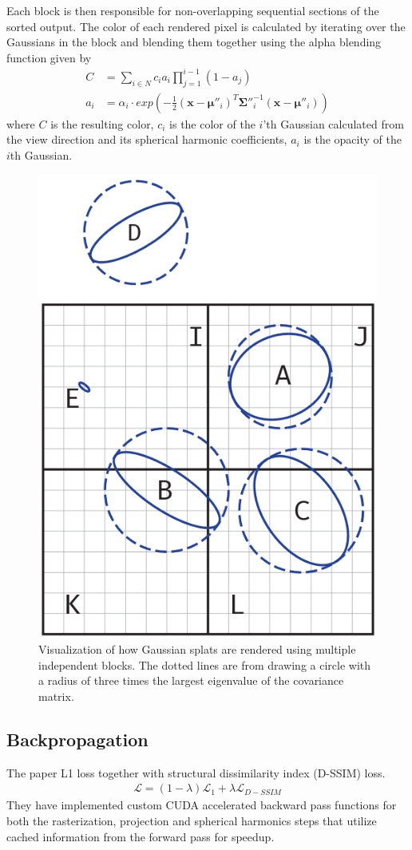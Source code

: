 Each block is then responsible for non-overlapping sequential sections of the sorted output.
The color of each rendered pixel is calculated by iterating over the Gaussians in the block and blending them together using the alpha blending function given by
\begin{align}
    C   & = \sum_{i \in N} c_i a_i \prod_{j=1}^{i-1} (1-a_j)                                                     \\
    a_i & = \alpha_i \cdot exp(-\frac{1}{2}(\bm{x}-\bm{\mu}''_i)^T \bm{\Sigma}{''}_i^{-1} (\bm{x}-\bm{\mu}''_i))
    \label{eq:alpha_blending}
\end{align}
where $C$ is the resulting color, $c_i$ is the color of the $i$'th Gaussian calculated from the view direction and its spherical harmonic coefficients, $a_i$ is the opacity of the $i$th Gaussian.

\begin{figure}
    \centering
    \includegraphics[width=0.6\linewidth]{images/rendering.png}
    \caption{Visualization of how Gaussian splats are rendered using multiple independent blocks. The dotted lines are from drawing a circle with a radius of three times the largest eigenvalue of the covariance matrix.}
    \label{fig:rendering}
\end{figure}


\subsection{Backpropagation}
The paper L1 loss together with structural dissimilarity index (D-SSIM) loss.
\begin{align}
    \mathcal{L} = (1 - \lambda) \mathcal{L}_1 + \lambda \mathcal{L}_{D-SSIM}
\end{align}
They have implemented custom CUDA accelerated backward pass functions for both the rasterization, projection and spherical harmonics steps that utilize cached information from the forward pass for speedup.



